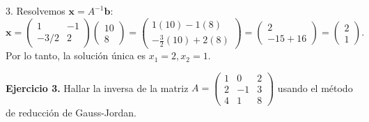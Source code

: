 \documentclass[11pt,letterpaper]{article}
\theoremstyle{definition}
\theoremstyle{plain}
\newcommand{\vv}[1]{\mathbf{#1}}
\begin{document}
3. Resolvemos $\vv{x} = A^{-1}\vv{b}$:
\[
\vv{x} = \begin{pmatrix} 1 & -1 \\ -3/2 & 2 \end{pmatrix} \begin{pmatrix} 10 \\ 8 \end{pmatrix} = \begin{pmatrix} 1(10) - 1(8) \\ -\frac{3}{2}(10) + 2(8) \end{pmatrix} = \begin{pmatrix} 2 \\ -15 + 16 \end{pmatrix} = \begin{pmatrix} 2 \\ 1 \end{pmatrix}.
\]
Por lo tanto, la solución única es $x_1 = 2, x_2 = 1$.

\vspace{0.3cm}
\textbf{Ejercicio 3.} Hallar la inversa de la matriz $A = \begin{pmatrix} 1 & 0 & 2 \\ 2 & -1 & 3 \\ 4 & 1 & 8 \end{pmatrix}$ usando el método de reducción de Gauss-Jordan.
\end{document}
